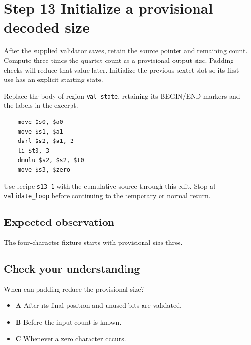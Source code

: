 \section{Step 13 Initialize a provisional decoded size}\label{base64-s13}

After the supplied validator saves, retain the source pointer and remaining count. Compute three times the quartet count as a provisional output size. Padding checks will reduce that value later. Initialize the previous-sextet slot so its first use has an explicit starting state.

Replace the body of region \texttt{val\_state}, retaining its BEGIN/END markers and the labels in the excerpt.

\begin{verbatim}
    move $s0, $a0
    move $s1, $a1
    dsrl $s2, $a1, 2
    li $t0, 3
    dmulu $s2, $s2, $t0
    move $s3, $zero
\end{verbatim}

Use recipe \texttt{s13-1} with the cumulative source through this edit. Stop at \texttt{validate\_loop} before continuing to the temporary or normal return.

\subsection{Expected observation}
The four-character fixture starts with provisional size three.

\subsection{Check your understanding}
When can padding reduce the provisional size?

\begin{itemize}
\item \textbf{A} After its final position and unused bits are validated.
\item \textbf{B} Before the input count is known.
\item \textbf{C} Whenever a zero character occurs.
\end{itemize}
